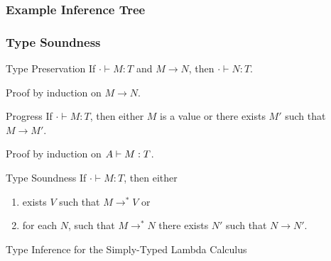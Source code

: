 \documentclass[pdftex,aspectratio=169]{beamer}
\begin{document}
\begin{frame}
  \frametitle{Example Inference Tree}
  \begin{mathpar}
  \end{mathpar}
\end{frame}

\begin{frame}
  \frametitle{Type Soundness}
  \vspace{-\baselineskip}
  \begin{block}{Type Preservation}
    If $\cdot \vdash M : T$ and $M \rightarrow N$, then $\cdot
    \vdash N : T$.
  \end{block}
  Proof by induction on $M \rightarrow N$.
  \begin{block}{Progress}
    If $\cdot \vdash M : T$, then either $M$ is
    a value or there exists $M'$ such that $M \rightarrow M'$.
  \end{block}
  Proof by induction on $\Tenv \vdash M : T$.
  \begin{block}{Type Soundness}
    If $\cdot\vdash M : T$, then either
    \begin{enumerate}
    \item exists $V$ such that $M \rightarrow^* V$ or
    \item for each $N$, such that $M \rightarrow^* N$ there exists
      $N'$ such that $N\rightarrow N'$.
    \end{enumerate}
  \end{block}
\end{frame}


\begin{frame}[fragile]
  \Huge
  \begin{center}
    {Type Inference for the Simply-Typed Lambda Calculus}
  \end{center}
\end{frame}
\end{document}

